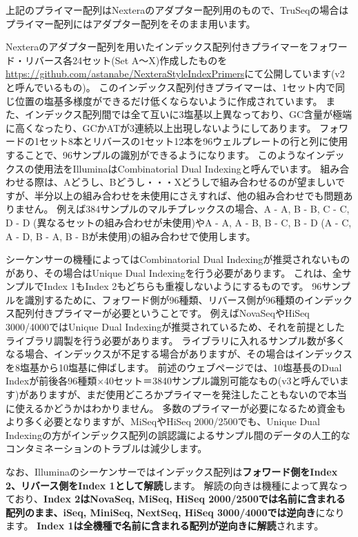 \documentclass[titlepage,10pt,a4paper,uplatex]{jsbook}
\renewcommand{\textbf}[1]{{\bfseries\sffamily#1}}
\begin{document}
上記のプライマー配列はNexteraのアダプター配列用のもので、TruSeqの場合はプライマー配列にはアダプター配列をそのまま用います。

Nexteraのアダプター配列を用いたインデックス配列付きプライマーをフォワード・リバース各24セット(Set A～X)作成したものを\url{https://github.com/astanabe/NexteraStyleIndexPrimers}にて公開しています(v2と呼んでいるもの)。
このインデックス配列付きプライマーは、1セット内で同じ位置の塩基多様度ができるだけ低くならないように作成されています。
また、インデックス配列間では全て互いに3塩基以上異なっており、GC含量が極端に高くなったり、GCかATが3連続以上出現しないようにしてあります。
フォワードの1セット8本とリバースの1セット12本を96ウェルプレートの行と列に使用することで、96サンプルの識別ができるようになります。
このようなインデックスの使用法をIlluminaはCombinatorial Dual Indexingと呼んでいます。
組み合わせる際は、Aどうし、Bどうし・・・Xどうしで組み合わせるのが望ましいですが、半分以上の組み合わせを未使用にさえすれば、他の組み合わせでも問題ありません。
例えば384サンプルのマルチプレックスの場合、A - A, B - B, C - C, D - D (異なるセットの組み合わせが未使用)やA - A, A - B, B - C, B - D (A - C, A - D, B - A, B - Bが未使用)の組み合わせで使用します。

シーケンサーの機種によってはCombinatorial Dual Indexingが推奨されないものがあり、その場合はUnique Dual Indexingを行う必要があります。
これは、全サンプルでIndex 1もIndex 2もどちらも重複しないようにするものです。
96サンプルを識別するために、フォワード側が96種類、リバース側が96種類のインデックス配列付きプライマーが必要ということです。
例えばNovaSeqやHiSeq 3000/4000ではUnique Dual Indexingが推奨されているため、それを前提としたライブラリ調製を行う必要があります。
ライブラリに入れるサンプル数が多くなる場合、インデックスが不足する場合がありますが、その場合はインデックスを8塩基から10塩基に伸ばします。
前述のウェブページでは、10塩基長のDual Indexが前後各96種類×40セット＝3840サンプル識別可能なもの(v3と呼んでいます)がありますが、まだ使用どころかプライマーを発注したこともないので本当に使えるかどうかはわかりません。
多数のプライマーが必要になるため資金もより多く必要となりますが、MiSeqやHiSeq 2000/2500でも、Unique Dual Indexingの方がインデックス配列の誤認識によるサンプル間のデータの人工的なコンタミネーションのトラブルは減少します。

なお、Illuminaのシーケンサーではインデックス配列は\textbf{フォワード側をIndex 2、リバース側をIndex 1として解読}します。
解読の向きは機種によって異なっており、\textbf{Index 2はNovaSeq, MiSeq, HiSeq 2000/2500では名前に含まれる配列のまま、iSeq, MiniSeq, NextSeq, HiSeq 3000/4000では逆向き}になります。
\textbf{Index 1は全機種で名前に含まれる配列が逆向きに解読}されます。
\end{document}
